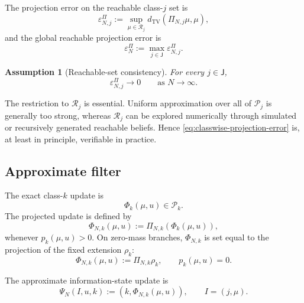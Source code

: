 \documentclass[10pt,twocolumn]{article}
\newtheorem{assumption}{Assumption}
\theoremstyle{remark}
\newcommand{\Pcal}{\mathcal{P}}
\begin{document}
The projection error on the reachable class-\(j\) set is
\begin{equation}
	\varepsilon_{N,j}^{\Pi}
	:=
	\sup_{\mu\in\mathcal R_j}
	d_{\mathrm{TV}}
	\left(
	\Pi_{N,j}\mu,\mu
	\right),
	\label{eq:classwise-projection-error}
\end{equation}
and the global reachable projection error is
\begin{equation}
	\varepsilon_N^{\Pi}
	:=
	\max_{j\in\mathsf J}
	\varepsilon_{N,j}^{\Pi}.
	\label{eq:global-projection-error}
\end{equation}

\begin{assumption}[Reachable-set consistency]
	\label{ass:reachable-projection-consistency}
	For every \(j\in\mathsf J\),
	\begin{equation*}
		\varepsilon_{N,j}^{\Pi}\longrightarrow0
		\qquad\text{as }N\to\infty.
		\label{eq:reachable-consistency}
	\end{equation*}
\end{assumption}

The restriction to \(\mathcal R_j\) is essential. Uniform approximation over all of \(\Pcal_j\) is generally too strong, whereas \(\mathcal R_j\) can be explored numerically through simulated or recursively generated reachable beliefs. Hence \cref{eq:classwise-projection-error} is, at least in principle, verifiable in practice.

\subsection{Approximate filter}
\label{subsec:approximate-filter}

The exact class-\(k\) update is
\[
\Phi_k(\mu,u)\in\Pcal_k.
\]
The projected update is defined by
\begin{equation}
	\Phi_{N,k}(\mu,u)
	:=
	\Pi_{N,k}\!\left(\Phi_k(\mu,u)\right),
	\label{eq:approximate-filter}
\end{equation}
whenever \(p_k(\mu,u)>0\). On zero-mass branches, \(\Phi_{N,k}\) is set equal to the projection of the fixed extension \(\rho_k\):
\begin{equation}
	\Phi_{N,k}(\mu,u)
	:=
	\Pi_{N,k}\rho_k,
	\qquad
	p_k(\mu,u)=0.
	\label{eq:approximate-zero-mass-filter}
\end{equation}

The approximate information-state update is
\begin{equation}
	\Psi_N(I,u,k)
	:=
	\left(
	k,\Phi_{N,k}(\mu,u)
	\right),
	\qquad
	I=(j,\mu).
	\label{eq:approximate-information-update}
\end{equation}
\end{document}
